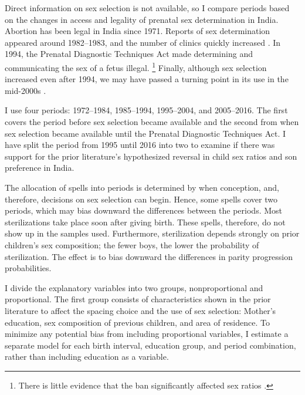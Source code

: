 \documentclass[12pt,letterpaper]{article}
\begin{document}
% 

Direct information on sex selection is not available, so I compare periods 
based on the changes in access and legality of prenatal sex determination in India.
Abortion has been legal in India since 1971.
Reports of sex determination appeared around 1982--1983, and the number of clinics 
quickly increased \citep{Sudha1999,bhat06,Grover2006}.
In 1994, the Prenatal Diagnostic Techniques Act made determining and communicating 
the sex of a fetus illegal.%
\footnote{
There is little evidence that the ban significantly affected sex ratios \citep{Das-Gupta2019}.
}
Finally, although sex selection increased even after 1994, we may have passed a 
turning point in its use in the mid-2000s \citep{Das_Gupta2009,Kumar2012,Bongaarts2013,Diamond-Smith2015}.

I use four periods: 1972--1984, 1985--1994, 1995--2004, and 2005--2016.
The first covers the period before sex selection became available and the second from when sex 
selection became available until the Prenatal Diagnostic Techniques Act.
I have split the period from 1995 until 2016 into two to examine if there was support for 
the prior literature's hypothesized reversal in child sex ratios and son 
preference in India.

The allocation of spells into periods is determined by when conception, and, therefore, 
decisions on sex selection can begin. 
Hence, some spells cover two periods, which may bias downward the differences between the 
periods.
Most sterilizations take place soon after giving birth. 
These spells, therefore, do not show up in the samples used. 
Furthermore, sterilization depends strongly on prior children's sex composition; the 
fewer boys, the lower the probability of sterilization. 
The effect is to bias downward the differences in parity progression probabilities.

I divide the explanatory variables into two groups, nonproportional and proportional. 
The first group consists of characteristics shown in the prior literature to affect the 
spacing choice and the use of sex selection: Mother’s education, sex composition of 
previous children, and area of residence.
To minimize any potential bias from including proportional variables, I estimate a 
separate model for each birth interval, education group, and period combination, rather 
than including education as a variable. 
\end{document}
